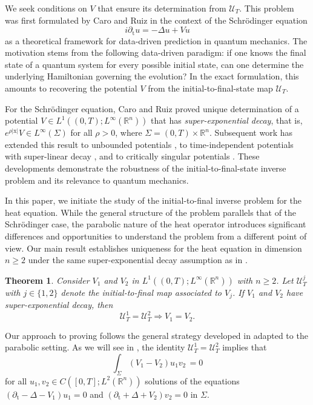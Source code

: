 \documentclass[10pt,a4paper]{amsart}
\newtheorem{main-theorem}{Theorem}
\theoremstyle{remark}
\theoremstyle{definition}
\newcommand{\R}{\mathbb{R}}
\newcommand{\tm}{\mathrm{t}}
\newcommand{\x}{\mathrm{x}}
\begin{document}
We seek conditions on $V$ that ensure its determination from $\mathcal{U}_T$. This problem was 
first formulated by Caro and Ruiz \cite{zbMATH07801151} in the context of the Schrödinger equation
\[ i \partial_\tm u = -\Delta u + V u \]
as a theoretical framework for data-driven prediction in quantum mechanics.
The motivation stems from the following data-driven paradigm: if one knows the final state of a 
quantum system for every possible initial state, can one determine the underlying Hamiltonian 
governing the evolution? In the exact formulation, this amounts to recovering the potential $V$ 
from the initial-to-final-state map $\mathcal{U}_T$.

For the Schrödinger equation, Caro and Ruiz \cite{zbMATH07801151} proved unique
determination of a potential
$V \in L^1((0,T); L^\infty(\R^n))$ that has \emph{super-exponential decay}, that is,
$ e^{\rho |\x|} V \in L^\infty(\Sigma) $ for all $\rho > 0$, where 
$\Sigma = (0, T) \times \R^n$.
Subsequent work has extended this result to unbounded potentials \cite{arXiv:2512.04796}, 
to time-independent potentials with super-linear decay \cite{zbMATH08122191}, and to critically 
singular potentials \cite{arXiv:2602.12122}. These developments demonstrate the robustness of the 
initial-to-final-state inverse problem and its relevance to quantum mechanics.

In this paper, we initiate the study of the initial-to-final inverse problem for the heat equation. 
While the general structure of the problem parallels that of the Schr\"odinger case, the parabolic 
nature of the heat operator introduces significant differences and opportunities to understand
the problem from a different point of view. Our main result establishes uniqueness for the heat 
equation in dimension $n \geq 2$ under the same super-exponential decay assumption as in 
\cite{zbMATH07801151}.

\begin{main-theorem}\label{th:uniqueness} \sl
Consider $V_1$ and $V_2$ in $L^1((0, T); L^\infty (\R^n))$ with $n \geq 2$.
Let $\mathcal{U}_T^j$ with $j \in \{ 1, 2 \}$ denote 
the initial-to-final map associated to $V_j$. If 
$V_1$ and $V_2$ have super-exponential decay, then
\[ \mathcal{U}_T^1 = \mathcal{U}_T^2 \Rightarrow V_1 = V_2. \]
\end{main-theorem}

Our approach to proving  follows the general strategy developed in
\cite{zbMATH07801151} adapted to the parabolic setting.
As we will see in , the identity 
$\mathcal{U}_T^1 = \mathcal{U}_T^2$ implies that
\begin{equation}\label{id:orthogonality}
\int_\Sigma (V_1 - V_2) u_1 v_2 \, = 0
\end{equation}
for all $u_1, v_2 \in C([0,T]; L^2(\R^n))$ solutions of the equations 
$(\partial_\tm - \Delta - V_1) u_1 = 0$ and $(\partial_\tm + \Delta + V_2) v_2 = 0$ in 
$\Sigma$.
\end{document}

